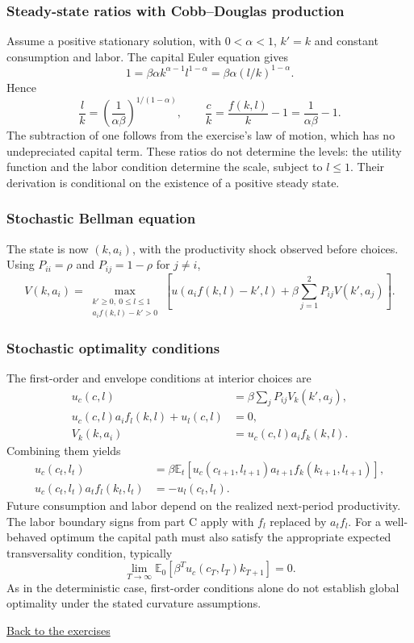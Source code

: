 \subsubsection{Steady-state ratios with Cobb--Douglas production}
Assume a positive stationary solution, with $0<\alpha<1$, $k'=k$ and constant consumption and labor. The capital Euler equation gives
\[
1=\beta\alpha k^{\alpha-1}l^{1-\alpha}
=\beta\alpha(l/k)^{1-\alpha}.
\]
Hence
\[
\frac{l}{k}=\left(\frac{1}{\alpha\beta}\right)^{1/(1-\alpha)},\qquad
\frac{c}{k}=\frac{f(k,l)}{k}-1=\frac{1}{\alpha\beta}-1.
\]
The subtraction of one follows from the exercise's law of motion, which has no undepreciated capital term. These ratios do not determine the levels: the utility function and the labor condition determine the scale, subject to $l\leq1$. Their derivation is conditional on the existence of a positive steady state.

\subsubsection{Stochastic Bellman equation}
The state is now $(k,a_i)$, with the productivity shock observed before choices. Using $P_{ii}=\rho$ and $P_{ij}=1-\rho$ for $j\ne i$,
\[
V(k,a_i)=\max_{\substack{k'\geq0,\ 0\leq l\leq1\\ a_i f(k,l)-k'>0}}
\left[u(a_i f(k,l)-k',l)+\beta\sum_{j=1}^2P_{ij}V(k',a_j)\right].
\]

\subsubsection{Stochastic optimality conditions}
The first-order and envelope conditions at interior choices are
\[
\begin{aligned}
u_c(c,l)&=\beta\sum_jP_{ij}V_k(k',a_j),\\
u_c(c,l)a_i f_l(k,l)+u_l(c,l)&=0,\\
V_k(k,a_i)&=u_c(c,l)a_i f_k(k,l).
\end{aligned}
\]
Combining them yields
\[
\begin{aligned}
u_c(c_t,l_t)&=\beta\mathbb{E}_t\left[u_c(c_{t+1},l_{t+1})a_{t+1}f_k(k_{t+1},l_{t+1})\right],\\
u_c(c_t,l_t)a_t f_l(k_t,l_t)&=-u_l(c_t,l_t).
\end{aligned}
\]
Future consumption and labor depend on the realized next-period productivity. The labor boundary signs from part C apply with $f_l$ replaced by $a_t f_l$. For a well-behaved optimum the capital path must also satisfy the appropriate expected transversality condition, typically
\[
\lim_{T\to\infty}\mathbb{E}_0\left[\beta^T u_c(c_T,l_T)k_{T+1}\right]=0.
\]
As in the deterministic case, first-order conditions alone do not establish global optimality under the stated curvature assumptions.

\href{ps1.tex}{Back to the exercises}
